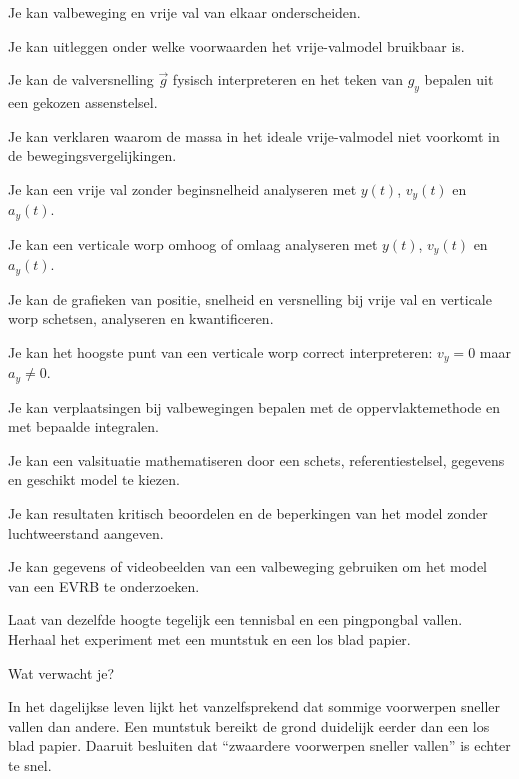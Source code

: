 \documentclass{ximera}
\begin{document}
\begin{leerdoelen}
  \item Je kan valbeweging en vrije val van elkaar onderscheiden.
  \item Je kan uitleggen onder welke voorwaarden het vrije-valmodel bruikbaar is.
  \item Je kan de valversnelling $\vec g$ fysisch interpreteren en het teken van $g_y$ bepalen uit een gekozen assenstelsel.
  \item Je kan verklaren waarom de massa in het ideale vrije-valmodel niet voorkomt in de bewegingsvergelijkingen.
  \item Je kan een vrije val zonder beginsnelheid analyseren met $y(t)$, $v_y(t)$ en $a_y(t)$.
  \item Je kan een verticale worp omhoog of omlaag analyseren met $y(t)$, $v_y(t)$ en $a_y(t)$.
  \item Je kan de grafieken van positie, snelheid en versnelling bij vrije val en verticale worp schetsen, analyseren en kwantificeren.
  \item Je kan het hoogste punt van een verticale worp correct interpreteren: $v_y=0$ maar $a_y\neq0$.
  \item Je kan verplaatsingen bij valbewegingen bepalen met de oppervlaktemethode en met bepaalde integralen.
  \item Je kan een valsituatie mathematiseren door een schets, referentiestelsel, gegevens en geschikt model te kiezen.
  \item Je kan resultaten kritisch beoordelen en de beperkingen van het model zonder luchtweerstand aangeven.
  \item Je kan gegevens of videobeelden van een valbeweging gebruiken om het model van een EVRB te onderzoeken.
\end{leerdoelen}




Laat van dezelfde hoogte tegelijk een tennisbal en een pingpongbal
vallen. Herhaal het experiment met een muntstuk en een los blad papier.

Wat verwacht je?

In het dagelijkse leven lijkt het vanzelfsprekend dat sommige
voorwerpen sneller vallen dan andere. Een muntstuk bereikt de grond
duidelijk eerder dan een los blad papier. Daaruit besluiten dat
``zwaardere voorwerpen sneller vallen'' is echter te snel.
\end{document}
